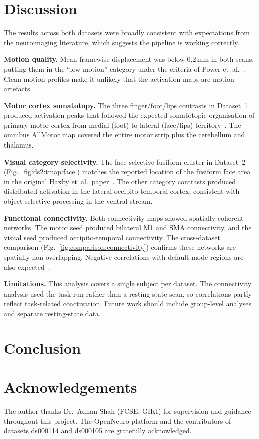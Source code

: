 \documentclass[12pt,a4paper]{article}
\begin{document}
\section{Discussion}
\label{sec:discussion}

The results across both datasets were broadly consistent with
expectations from the neuroimaging literature, which suggests the
pipeline is working correctly.

\textbf{Motion quality.}
Mean framewise displacement was below 0.2\,mm in both scans, putting
them in the ``low motion'' category under the criteria of Power
et~al.~\cite{Power2012}. Clean motion profiles make it unlikely that
the activation maps are motion artefacts.

\textbf{Motor cortex somatotopy.}
The three finger/foot/lips contrasts in Dataset~1 produced activation
peaks that followed the expected somatotopic organisation of primary
motor cortex from medial (foot) to lateral (face/lips)
territory~\cite{Lotze2000}. The omnibus AllMotor map covered the
entire motor strip plus the cerebellum and thalamus.

\textbf{Visual category selectivity.}
The face-selective fusiform cluster in Dataset~2 (Fig.~\ref{fig:ds2:tmap:face})
matches the reported location of the fusiform face area in the
original Haxby et~al.\ paper~\cite{Haxby2001}. The other category
contrasts produced distributed activation in the lateral
occipito-temporal cortex, consistent with object-selective processing
in the ventral stream.

\textbf{Functional connectivity.}
Both connectivity maps showed spatially coherent networks. The motor
seed produced bilateral M1 and SMA connectivity, and the visual seed
produced occipito-temporal connectivity. The cross-dataset comparison
(Fig.~\ref{fig:comparison:connectivity}) confirms these networks are
spatially non-overlapping. Negative correlations with default-mode
regions are also expected~\cite{Biswal1995}.

\textbf{Limitations.}
This analysis covers a single subject per dataset. The connectivity
analysis used the task run rather than a resting-state scan, so
correlations partly reflect task-related coactivation. Future work
should include group-level analyses and separate resting-state data.

\section{Conclusion}
\label{sec:conclusion}


\section*{Acknowledgements}
The author thanks Dr.\ Adnan Shah (FCSE, GIKI) for supervision and
guidance throughout this project. The OpenNeuro platform and the
contributors of datasets ds000114 and ds000105 are gratefully
acknowledged.



\end{document}
